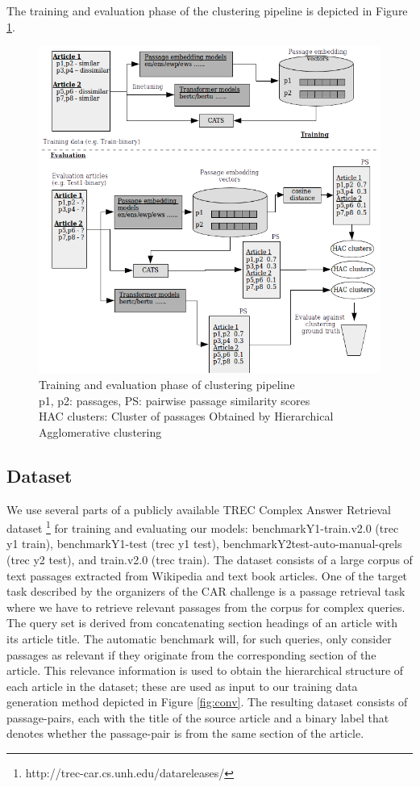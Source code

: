 The training and evaluation phase of the clustering pipeline is depicted in Figure \ref{fig:pipe}.
\begin{figure}[h]
  \centering
  \includegraphics[width=\linewidth]{graphics/pipeline2.png}
  \caption{Training and evaluation phase of clustering pipeline \\
  p1, p2: passages, PS: pairwise passage similarity scores \\
  HAC clusters: Cluster of passages Obtained by Hierarchical Agglomerative clustering}
  \label{fig:pipe}
\end{figure}

\subsection{Dataset} 
We use several parts of a publicly available TREC Complex Answer Retrieval dataset \cite{dietz2017trec}\footnote{http://trec-car.cs.unh.edu/datareleases/} for training and evaluating our models: benchmarkY1-train.v2.0 (trec y1 train), benchmarkY1-test (trec y1 test), benchmarkY2test-auto-manual-qrels (trec y2 test), and train.v2.0 (trec train). The dataset consists of a large corpus of text passages extracted from Wikipedia and text book articles. One of the target task described by the organizers of the CAR challenge  is a passage retrieval task where we have to retrieve relevant passages from the corpus for complex queries. The query set is derived from concatenating section headings of an article with its article title. The automatic benchmark will, for such queries, only consider passages as relevant if they originate from the corresponding section of the article. This relevance information is used to obtain the hierarchical structure of each article in the dataset; these are used as input to our training data generation method depicted in Figure \ref{fig:conv}. The resulting dataset consists of passage-pairs, each with the title of the source article and a binary label that denotes whether the passage-pair is from the same section of the article.

